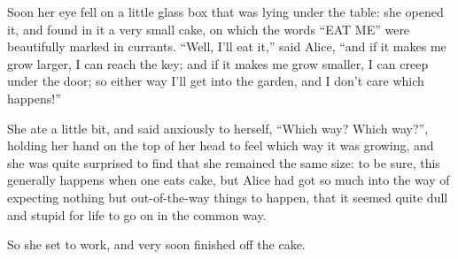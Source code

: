 \documentclass[10pt]{article}
\begin{document}
Soon her eye fell on a little glass box that was lying under the table: she opened it, and found in it a very small cake, on which the words ``EAT ME'' were beautifully marked in currants. ``Well, I'll eat it,'' said Alice, ``and if it makes me grow larger, I can reach the key; and if it makes me grow smaller, I can creep under the door; so either way I'll get into the garden, and I don't care which happens!''

She ate a little bit, and said anxiously to herself, ``Which way? Which way?'', holding her hand on the top of her head to feel which way it was growing, and she was quite surprised to find that she remained the same size: to be sure, this generally happens when one eats cake, but Alice had got so much into the way of expecting nothing but out-of-the-way things to happen, that it seemed quite dull and stupid for life to go on in the common way.

So she set to work, and very soon finished off the cake.
\end{document}

